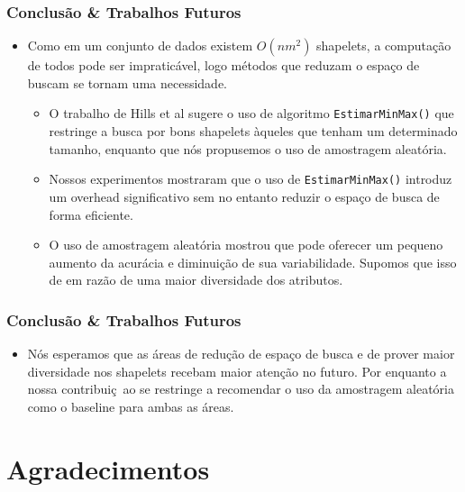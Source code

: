 \documentclass{beamer}
\begin{document}

\begin{frame}
\frametitle{Conclus{\~a}o \& Trabalhos Futuros}
\begin{itemize}
\item Como em um conjunto de dados existem $O(nm^{2})$ shapelets, a computa{\c c}{\~a}o de todos pode ser impratic{\'a}vel, logo m{\'e}todos que reduzam o espa{\c c}o de buscam se tornam uma necessidade.

\begin{itemize}
\item O trabalho de Hills et al \cite{Hills:2013dk} sugere o uso de algoritmo \texttt{EstimarMinMax()} que restringe a busca por bons shapelets {\`a}queles que tenham um determinado tamanho, enquanto que n{\'o}s propusemos o uso de amostragem aleat{\'o}ria.

\item Nossos experimentos mostraram que o uso de \texttt{EstimarMinMax()} introduz um overhead significativo sem no entanto reduzir o espa{\c c}o de busca de forma eficiente.

\item O uso de amostragem aleat{\'o}ria mostrou que pode oferecer um pequeno aumento da acur{\'a}cia e diminui{\c c}{\~a}o de sua variabilidade. Supomos que isso de em raz{\~a}o de uma maior diversidade dos atributos.
\end{itemize}
\end{itemize}
\end{frame}


\begin{frame}
\frametitle{Conclus{\~a}o \& Trabalhos Futuros}
\begin{itemize}
\item N{\'o}s esperamos que as {\'a}reas de redu{\c c}{\~a}o de espa{\c c}o de busca e de prover maior diversidade nos shapelets recebam maior aten{\c c}{\~a}o no futuro. Por enquanto a nossa contribui{\c c}{~a}o se restringe a recomendar o uso da amostragem aleat{\'o}ria como o baseline para ambas as {\'a}reas.
\end{itemize}
\end{frame}

\section{Agradecimentos}
\end{document}
